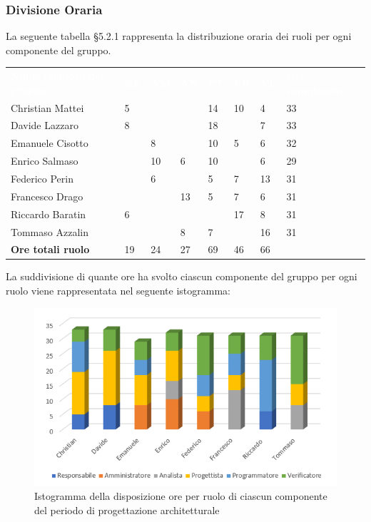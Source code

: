 \subsubsection{Divisione Oraria}
La seguente tabella §5.2.1 rappresenta la distribuzione oraria dei ruoli per ogni componente del gruppo.
{
	\renewcommand{\arraystretch}{2}
	\centering
	\begin{longtable}{ C{5cm} C{1cm} C{1cm} C{1cm} C{1cm} C{1cm} C{1cm} C{3cm}}
		\textcolor{white}{\textbf{Nome membro del gruppo}} & \textcolor{white}{\textbf{RE}} & \textcolor{white}{\textbf{AM}} & \textcolor{white}{\textbf{AN}} & \textcolor{white}{\textbf{PT}} & \textcolor{white}{\textbf{PR}} & \textcolor{white}{\textbf{VE}} & \textcolor{white}{\textbf{Ore complessive}}\\	
        
        Christian Mattei & 5 & & & 14 & 10 & 4 & 33\\
        Davide Lazzaro & 8 & & & 18 & & 7 & 33 \\
        Emanuele Cisotto & & 8 & & 10 & 5 & 6 & 32 \\
        Enrico Salmaso & & 10 & 6 & 10 & & 6 & 29 \\
        Federico Perin & & 6 & & 5 & 7 & 13 &  31\\
        Francesco Drago & & & 13 & 5 & 7 & 6 & 31 \\
        Riccardo Baratin & 6 & & & & 17 & 8 & 31\\
        Tommaso Azzalin & & & 8 & 7 & & 16 & 31\\
        \textbf{Ore totali ruolo} & 19 & 24 & 27 & 69 & 46 & 66 & \\
		
	\end{longtable}
}

La suddivisione di quante ore ha svolto ciascun componente del gruppo per ogni ruolo viene rappresentata nel seguente istogramma:

\begin{figure}[h]
	\centering
	\includegraphics[scale=3]{sezioni/Istogrammi/IstogrammaProgettArchitetturale.png}
	\caption{Istogramma della disposizione ore per ruolo di ciascun componente del periodo di progettazione architetturale}
\end{figure}

